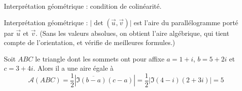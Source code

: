 Interprétation géométrique : condition de colinéarité.

Interprétation géométrique : $\lvert \det(\vec u, \vec v)\rvert $ est l'aire du parallélogramme porté par $\vec u$ et $\vec v$. (Sans les valeurs absolues, on obtient l'aire algébrique, qui tient compte de l'orientation, et vérifie de meilleures formules.)

\begin{exemple}
Soit $ABC$ le triangle dont les sommets ont pour affixe $a=1+i$, $b=5+2i$ et $c=3+4i$. Alors il a une aire égale à 
\[\mathcal A(ABC)= \frac12\left|\Im \overline{(b-a)}(c-a)\right| = \frac12\left|\Im (4-i)(2+3i)\right|=5\]
\end{exemple}

